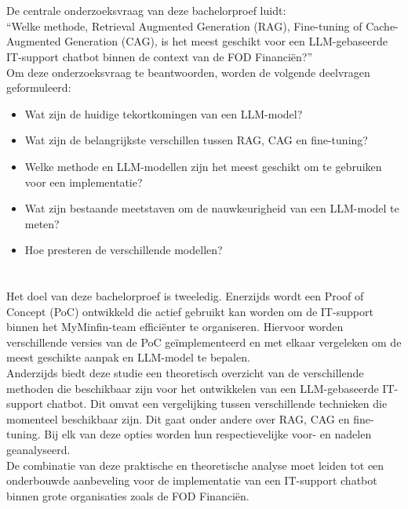 \section{}%
\label{sec:onderzoeksvraag}

De centrale onderzoeksvraag van deze bachelorproef luidt:
\\[1em]
“{Welke methode, Retrieval Augmented Generation (RAG), Fine-tuning of Cache-Augmented Generation (CAG), is het meest geschikt voor een LLM-gebaseerde IT-support chatbot binnen de context van de FOD Financiën?}”
\\[1em]
Om deze onderzoeksvraag te beantwoorden, worden de volgende deelvragen geformuleerd:

\begin{itemize}
    \item Wat zijn de huidige tekortkomingen van een LLM-model?
    \item Wat zijn de belangrijkste verschillen tussen RAG, CAG en fine-tuning?
    \item Welke methode en LLM-modellen zijn het meest geschikt om te gebruiken voor een implementatie?
    \item Wat zijn bestaande meetstaven om de nauwkeurigheid van een LLM-model te meten?
    \item Hoe presteren de verschillende modellen?
\end{itemize}

\section{}%
\label{sec:onderzoeksdoelstelling}

Het doel van deze bachelorproef is tweeledig. Enerzijds wordt een Proof of Concept (PoC) ontwikkeld die actief gebruikt kan worden om de IT-support binnen het MyMinfin-team efficiënter te organiseren. Hiervoor worden verschillende versies van de PoC geïmplementeerd en met elkaar vergeleken om de meest geschikte aanpak en LLM-model te bepalen.
\\[1em]
Anderzijds biedt deze studie een theoretisch overzicht van de verschillende methoden die beschikbaar zijn voor het ontwikkelen van een LLM-gebaseerde IT-support chatbot. Dit omvat een vergelijking tussen verschillende technieken die momenteel beschikbaar zijn. Dit gaat onder andere over RAG, CAG en fine-tuning. Bij elk van deze opties worden hun respectievelijke voor- en nadelen geanalyseerd.
\\[1em]
De combinatie van deze praktische en theoretische analyse moet leiden tot een onderbouwde aanbeveling voor de implementatie van een IT-support chatbot binnen grote organisaties zoals de FOD Financiën.

